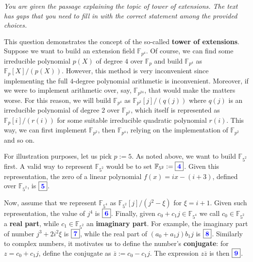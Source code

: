 \documentclass[../lecture-notes.tex]{subfiles}
\begin{document}
\begin{tcolorbox}[colback=blue!5!white,fonttitle=\bfseries,colframe=blue!80!white,title=Exercises 4-9. Tower of Extensions]
    \textit{You are given the passage explaining the topic of tower of extensions. The text has gaps that you need to fill in with the correct statement among the provided choices.}
    
    This question demonstrates the concept of the so-called \textbf{tower of extensions}. Suppose we want to build an extension field $\mathbb{F}_{p^4}$. Of course, we can find some irreducible polynomial $p(X)$ of degree $4$ over $\mathbb{F}_p$ and build $\mathbb{F}_{p^4}$ as $\mathbb{F}_p[X]/(p(X))$. However, this method is very inconvenient since implementing the full $4$-degree polynomial arithmetic is inconvenient. Moreover, if we were to implement arithmetic over, say, $\mathbb{F}_{p^{24}}$, that would make the matters worse. For this reason, we will build $\mathbb{F}_{p^4}$ as $\mathbb{F}_{p^2}[j]/(q(j))$ where $q(j)$ is an irreducible polynomial of degree $2$ over $\mathbb{F}_{p^2}$, which itself is represented as $\mathbb{F}_p[i]/(r(i))$ for some suitable irreducible quadratic polynomial $r(i)$. This way, we can first implement $\mathbb{F}_{p^2}$, then $\mathbb{F}_{p^4}$, relying on the implementation of $\mathbb{F}_{p^2}$ and so on.

    For illustration purposes, let us pick $p:=5$. As noted above, we want to build $\mathbb{F}_{5^2}$ first. A valid way to represent $\mathbb{F}_{5^2}$ would be to set $\mathbb{F}_{5^2} := \boxed{\textcolor{blue}{\textbf{4}}}$. Given this representation, the zero of a linear polynomial $f(x) = ix - (i+3)$, defined over $\mathbb{F}_{5^2}$, is $\boxed{\textcolor{blue}{\textbf{5}}}$.

    Now, assume that we represent $\mathbb{F}_{5^4}$ as $\mathbb{F}_{5^2}[j]/(j^2-\xi)$ for $\xi = i+1$. Given such representation, the value of $j^4$ is $\boxed{\textcolor{blue}{\textbf{6}}}$. Finally, given $c_0+c_1j \in \mathbb{F}_{5^4}$ we call $c_0 \in \mathbb{F}_{5^2}$ a \textbf{real part}, while $c_1 \in \mathbb{F}_{5^2}$ an \textbf{imaginary part}. For example, the imaginary part of number $j^3+2i^2\xi$ is $\boxed{\textcolor{blue}{\textbf{7}}}$, while the real part of $(a_0+a_1j)b_1j$ is $\boxed{\textcolor{blue}{\textbf{8}}}$. Similarly to complex numbers, it motivates us to define the number's \textbf{conjugate}: for $z = c_0+c_1j$, define the conjugate as $\overline{z} := c_0-c_1j$. The expression $z\overline{z}$ is then $\boxed{\textcolor{blue}{\textbf{9}}}$.
\end{tcolorbox}
\end{document}
